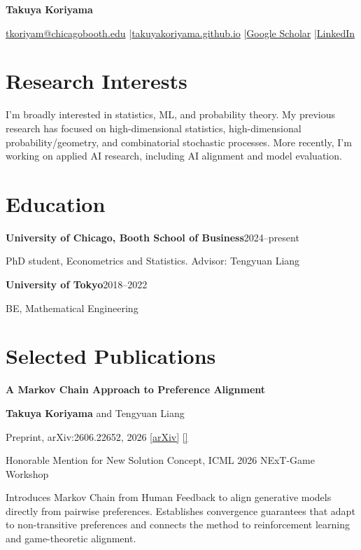 \documentclass[11pt,letterpaper]{article}
\newcommand{\paper}[6]{{\normalsize\bfseries\color{accent}#2\par}
  {\small #3\par#4%
  \if\relax\detokenize{#1}\relax\else\enspace\href{#1}{[arXiv]}\fi%
  \if\relax\detokenize{#5}\relax\else\enspace\href{#5}{[#6]}\fi\par}\vspace{4pt}}
\newcommand{\entrygap}{\par\vspace{11pt}}
\newcommand{\recognition}[1]{{\small #1\par}\vspace{3pt}}
\begin{document}
{\LARGE\bfseries Takuya Koriyama}\par
\vspace{4pt}
\href{mailto:tkoriyam@chicagobooth.edu}{tkoriyam@chicagobooth.edu}
\enspace |\enspace \href{https://takuyakoriyama.github.io/}{takuyakoriyama.github.io}
\enspace |\enspace \href{https://scholar.google.com/citations?user=JOqLea0AAAAJ\&hl=en}{Google Scholar}
\enspace |\enspace \href{https://www.linkedin.com/in/takuya-koriyama-a4ab052a1/?isSelfProfile=true}{LinkedIn}

\section*{Research Interests}
I’m broadly interested in statistics, ML, and probability theory. My previous research has focused on high-dimensional statistics, high-dimensional probability/geometry, and combinatorial stochastic processes. More recently, I'm working on applied AI research, including AI alignment and model evaluation. 

\section*{Education}
\textbf{University of Chicago, Booth School of Business}\hfill 2024--present\par
PhD student, Econometrics and Statistics. Advisor: Tengyuan Liang
\vspace{3pt}\par
\textbf{University of Tokyo}\hfill 2018--2022\par
BE, Mathematical Engineering

\section*{Selected Publications}
\begin{minipage}{\linewidth}
\raggedright\small
\paper{https://arxiv.org/abs/2606.22652}
{A Markov Chain Approach to Preference Alignment}
{\textbf{Takuya Koriyama} and Tengyuan Liang}
{Preprint, arXiv:2606.22652, 2026}
{}
{}
\recognition{\color{gray}Honorable Mention for New Solution Concept, ICML 2026 NExT-Game Workshop}
Introduces Markov Chain from Human Feedback to align generative models directly from pairwise preferences. Establishes convergence guarantees that adapt to non-transitive preferences and connects the method to reinforcement learning and game-theoretic alignment.

\end{minipage}
\entrygap
\end{document}
